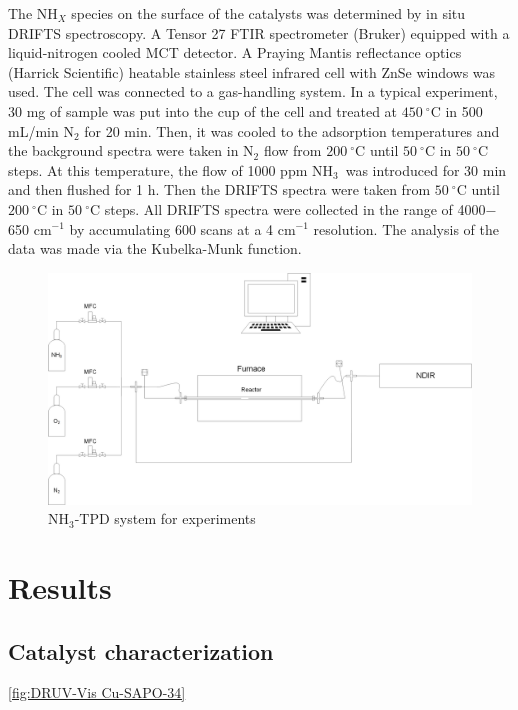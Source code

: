 \documentclass[preprint,12pt]{elsarticle}
\newcommand{\ammonia}{NH$_3$}
\newcommand{\degreeC}[1]{$#1\  ^{\circ}\mathrm{C}$}
\begin{document}
The NH$_X$ species on the surface of the catalysts was determined by in situ DRIFTS spectroscopy. A Tensor 27 FTIR spectrometer (Bruker) equipped with a liquid-nitrogen cooled MCT detector. A Praying Mantis reflectance optics (Harrick Scientific) heatable stainless steel infrared cell with ZnSe windows was used. The cell was connected to a gas-handling system. In a typical experiment, 30 mg of sample was put into the cup of the cell and treated at \degreeC{450} in 500 mL/min N$_2$ for 20 min. Then, it was cooled to the adsorption temperatures and the background spectra were taken in N$_2$ flow from \degreeC{200} until \degreeC{50} in \degreeC{50} steps. At this temperature, the flow of 1000 ppm \ammonia\ was introduced for 30 min and then flushed for 1 h. Then the DRIFTS spectra were taken from \degreeC{50} until \degreeC{200} in \degreeC{50} steps. All DRIFTS spectra were collected in the range of 4000$-$650 cm$^{-1}$ by accumulating 600 scans at a 4 cm$^{-1}$ resolution. The analysis of the data was made via the Kubelka-Munk function.


\begin{figure}
\centering
\centering\includegraphics[width=0.95\linewidth]{Figures/NH3TPD_fig.png}
\caption{\ammonia-TPD system for experiments}
\label{fig:NH3-TPD system}
\end{figure}


\section{Results}
\label{S:2}

\subsection{Catalyst characterization}

\ref{fig:DRUV-Vis Cu-SAPO-34}
\end{document}
